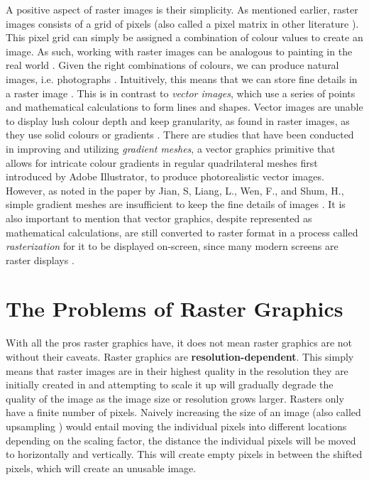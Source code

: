 A positive aspect of raster images is their simplicity. As mentioned earlier, raster images consists of a grid of pixels (also called a pixel matrix in other literature \cite{realtimevectorizationgpu}). This pixel grid can simply be assigned a combination of colour values to create an image. As such, working with raster images can be analogous to painting in the real world \cite{rastervsvector}. Given the right combinations of colours, we can produce natural images, i.e. photographs \cite{hoshyari2018perceptiondriven}. Intuitively, this means that we can store fine details in a raster image \cite{optimizedgradientmeshes}. This is in contrast to \textit{vector images}, which use a series of points and mathematical calculations to form lines and shapes. Vector images are unable to display lush colour depth and keep granularity, as found in raster images, as they use solid colours or gradients  \cite{rastervsvector}\cite{rastervsvectorgraphics}. There are studies that have been conducted in improving and utilizing \textit{gradient meshes}, a vector graphics primitive that allows for intricate colour gradients in regular quadrilateral meshes first introduced by Adobe Illustrator, to produce photorealistic vector images. However, as noted in the paper by Jian, S, Liang, L., Wen, F., and Shum, H., simple gradient meshes are insufficient to keep the fine details of images \cite{barendrecht2018locally}\cite{optimizedgradientmeshes}. It is also important to mention that vector graphics, despite represented as mathematical calculations, are still converted to raster format in a process called \textit{rasterization} for it to be displayed on-screen, since many modern screens are raster displays \cite{howdovectorgraphicswork}.

\section{The Problems of Raster Graphics}
With all the pros raster graphics have, it does not mean raster graphics are not without their caveats. Raster graphics are \textbf{resolution-dependent}. This simply means that raster images are in their highest quality in the resolution they are initially created in and attempting to scale it up will gradually degrade the quality of the image as the image size or resolution grows larger. Rasters only have a finite number of pixels. Naively increasing the size of an image (also called upsampling \cite{hoshyari2018perceptiondriven}) would entail moving the individual pixels into different locations depending on the scaling factor, the distance the individual pixels will be moved to horizontally and vertically. This will create empty pixels in between the shifted pixels, which will create an unusable image.



